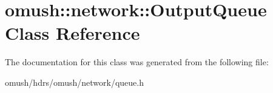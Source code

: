 \hypertarget{classomush_1_1network_1_1_output_queue}{\section{omush\-:\-:network\-:\-:Output\-Queue Class Reference}
\label{classomush_1_1network_1_1_output_queue}
}


The documentation for this class was generated from the following file\-:\begin{DoxyCompactItemize}
\item 
omush/hdrs/omush/network/queue.\-h\end{DoxyCompactItemize}
